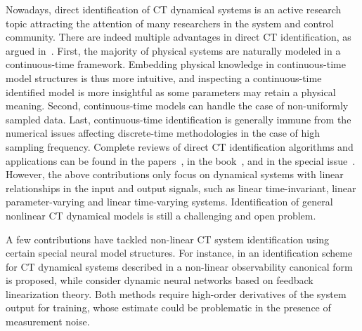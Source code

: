 \documentclass{article} %
\begin{document}
{
Nowadays, direct identification of CT dynamical systems is an active research topic attracting the attention of many researchers in the system and control community. 
There are indeed multiple advantages in direct CT identification, as argued in~\cite{Hugues2014}.  
First, the majority of physical systems are naturally modeled in a continuous-time framework. 
Embedding physical knowledge in continuous-time model structures is thus more intuitive, and inspecting a continuous-time identified model is more insightful as some parameters may retain a physical meaning.
Second, continuous-time models can handle the case of non-uniformly sampled data. Last, continuous-time identification is generally immune from the numerical issues affecting discrete-time methodologies in the case of high sampling frequency. 
Complete reviews of direct CT identification algorithms and applications  can be found in the papers~\cite{garnier2003continuous,mercere2011continuous,garnier2015direct,Hugues2014,LaPiPiTo17,PigaCont}, in   the book~\cite{Garnier:2008:ICM:1796449}, and in the special issue~\cite{garnier2014special}. However, the above contributions only focus on   dynamical systems with linear relationships in the  input and output signals, such as linear time-invariant, linear parameter-varying and linear time-varying systems. Identification of general nonlinear CT dynamical  models is still a challenging and open    problem.   
}

{A few contributions have tackled non-linear CT system identification using certain special neural model structures. For instance, in  \cite{liu2008continuous} an identification scheme for CT dynamical systems described in a non-linear observability canonical form is proposed, while \cite{ren2003identification} consider dynamic neural networks based on feedback linearization theory. Both methods require high-order derivatives of the system output for training, whose estimate could be problematic in the presence of measurement noise. 
}

\end{document}
